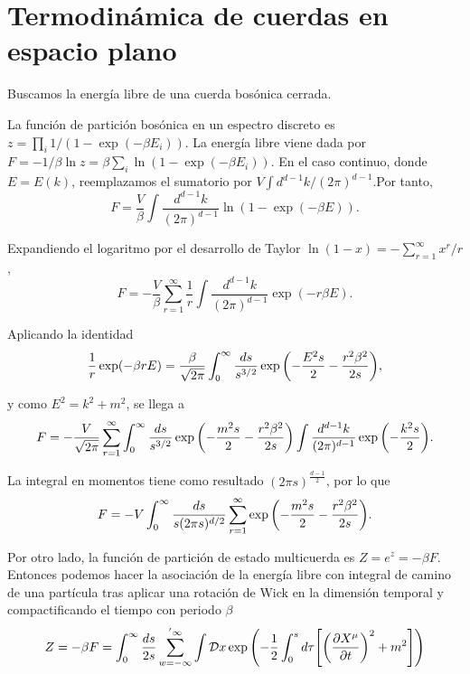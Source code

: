 \section{Termodinámica de cuerdas en espacio plano}

Buscamos la energía libre de una cuerda bosónica cerrada.

La función de partición bosónica en un espectro discreto es $z=\prod_i 1/(1-\exp(-\beta E_i))$.
La energía libre viene dada por $F=-1/\beta \ln z=\beta\sum_i \ln(1-\exp(-\beta E_i))$.
En el caso continuo, donde $E=E(k)$, reemplazamos el sumatorio por $V\int d^{d-1}k/(2\pi)^{d-1}$.Por tanto,
\begin{equation}
  F=\frac{V}{\beta}\int \frac{d^{d-1}k}{(2\pi)^{d-1}}\ln(1-\exp(-\beta E)).
\end{equation}

Expandiendo el logaritmo por el desarrollo de Taylor $\ln(1-x)=-\sum^\infty_{r=1} x^r/r$,
\begin{equation}
  F=-\frac{V}{\beta}\sum^\infty_{r=1} \frac 1 r\int \frac{d^{d-1}k}{(2\pi)^{d-1}}\exp(-r\beta E).
\end{equation}

Aplicando la identidad
\begin{equation}
  \frac 1 r \exp(-\beta r E)=\frac{\beta}{\sqrt{2\pi}}\int_0^\infty \frac{ds}{s^{3/2}}\exp\qty(-\frac{E^2s}{2}-\frac{r^2\beta^2}{2s}),
\end{equation}

y como $E^2=k^2+m^2$, se llega a 
\begin{equation}
  F=-\frac{V}{\sqrt{2\pi}}\sum^\infty_{r=1} \int_0^\infty \frac{ds}{s^{3/2}} \exp \qty(-\frac{m^2s}{2} -\frac{r^2\beta^2}{2s})
  \int \frac{d^{d-1}k}{(2\pi)^{d-1}}\exp\qty(-\frac{k^2s}{2}).
\end{equation}

La integral en momentos tiene como resultado $(2\pi s)^{\frac{d-1}{2}}$, por lo que
\begin{equation}
  F=-V \int_0^\infty \frac{ds}{s(2\pi s)^{d/2}}\sum^\infty_{r=1} \exp \qty(-\frac{m^2s}{2}- \frac{r^2\beta^2}{2s}).
\end{equation}

Por otro lado, la función de partición de estado multicuerda es $Z=e^z=-\beta F$. 
Entonces podemos hacer la asociación de la energía libre con integral de camino de 
una partícula tras aplicar una rotación de Wick en la dimensión temporal y compactificando el
tiempo con periodo $\beta$
\begin{equation}
  Z=-\beta F= \int_0^\infty \frac{ds}{2s}\sum^{'\infty}_{w=-\infty} \int \mathcal{D}x 
  \exp\qty(-\frac 1 2 \int_0^s d\tau \qty[\qty(\pdv{X^\mu}{t})^2+m^2])
\end{equation}

